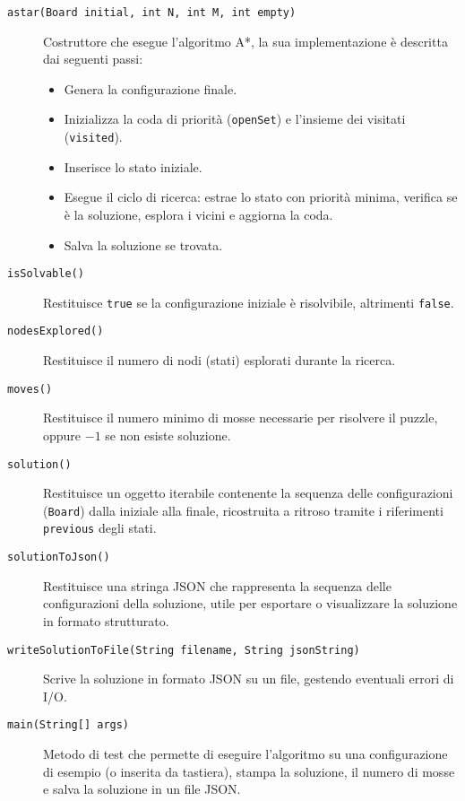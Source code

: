 \begin{description}
    \item[\texttt{astar(Board initial, int N, int M, int empty)}]
        Costruttore che esegue l'algoritmo A*, la sua implementazione è descritta dai seguenti passi:
        \begin{itemize}
            \item Genera la configurazione finale.
            \item Inizializza la coda di priorità (\texttt{openSet}) e l'insieme dei visitati (\texttt{visited}).
            \item Inserisce lo stato iniziale.
            \item Esegue il ciclo di ricerca: estrae lo stato con priorità minima, verifica se è la soluzione, esplora i vicini e aggiorna la coda.
            \item Salva la soluzione se trovata.
        \end{itemize}

    \item[\texttt{isSolvable()}]
        Restituisce \texttt{true} se la configurazione iniziale è risolvibile, altrimenti \texttt{false}.

    \item[\texttt{nodesExplored()}]
        Restituisce il numero di nodi (stati) esplorati durante la ricerca.

    \item[\texttt{moves()}]
        Restituisce il numero minimo di mosse necessarie per risolvere il puzzle, oppure $-1$ se non esiste soluzione.

    \item[\texttt{solution()}]
        Restituisce un oggetto iterabile contenente la sequenza delle configurazioni (\texttt{Board}) dalla iniziale alla finale, ricostruita a ritroso tramite i riferimenti \texttt{previous} degli stati.

    \item[\texttt{solutionToJson()}]
        Restituisce una stringa JSON che rappresenta la sequenza delle configurazioni della soluzione, utile per esportare o visualizzare la soluzione in formato strutturato.

    \item[\texttt{writeSolutionToFile(String filename, String jsonString)}]
        Scrive la soluzione in formato JSON su un file, gestendo eventuali errori di I/O.

    \item[\texttt{main(String[] args)}]
        Metodo di test che permette di eseguire l’algoritmo su una configurazione di esempio (o inserita da tastiera), stampa la soluzione, il numero di mosse e salva la soluzione in un file JSON.

\end{description}

